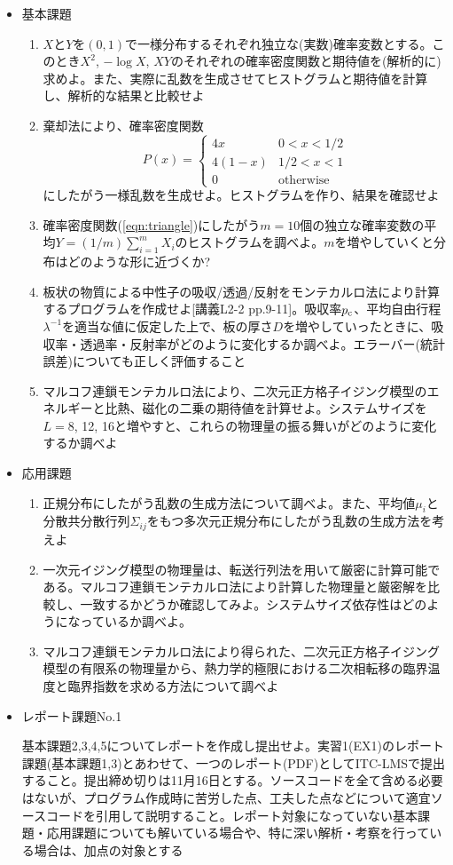 \documentclass[11pt]{jarticle}
\begin{document}
\begin{itemize}
\item 基本課題
  \begin{enumerate}
  \item $X$と$Y$を$(0,1)$で一様分布するそれぞれ独立な(実数)確率変数とする。このとき$X^2$, $-\log X$, $XY$のそれぞれの確率密度関数と期待値を(解析的に)求めよ。また、実際に乱数を生成させてヒストグラムと期待値を計算し、解析的な結果と比較せよ
  \item 棄却法により、確率密度関数
    \begin{equation}
      P(x) = \begin{cases} 4x & 0 < x < 1/2 \\
        4(1-x) & 1/2 < x < 1 \\
        0 & \text{otherwise}
      \end{cases}
      \label{eqn:triangle}
    \end{equation}
    にしたがう一様乱数を生成せよ。ヒストグラムを作り、結果を確認せよ
  \item 確率密度関数(\ref{eqn:triangle})にしたがう$m=10$個の独立な確率変数の平均$Y=(1/m) \sum_{i=1}^m X_i$のヒストグラムを調べよ。$m$を増やしていくと分布はどのような形に近づくか?
  \item 板状の物質による中性子の吸収/透過/反射をモンテカルロ法により計算するプログラムを作成せよ[講義L2-2 pp.9-11]。吸収率$p_{\rm c}$、平均自由行程$\lambda^{-1}$を適当な値に仮定した上で、板の厚さ$D$を増やしていったときに、吸収率・透過率・反射率がどのように変化するか調べよ。エラーバー(統計誤差)についても正しく評価すること
  \item マルコフ連鎖モンテカルロ法により、二次元正方格子イジング模型のエネルギーと比熱、磁化の二乗の期待値を計算せよ。システムサイズを$L=8$, 12, 16と増やすと、これらの物理量の振る舞いがどのように変化するか調べよ
  \end{enumerate}  
\item 応用課題
  \begin{enumerate}
  \item 正規分布にしたがう乱数の生成方法について調べよ。また、平均値$\mu_i$と分散共分散行列$\Sigma_{ij}$をもつ多次元正規分布にしたがう乱数の生成方法を考えよ
  \item 一次元イジング模型の物理量は、転送行列法を用いて厳密に計算可能である。マルコフ連鎖モンテカルロ法により計算した物理量と厳密解を比較し、一致するかどうか確認してみよ。システムサイズ依存性はどのようになっているか調べよ。
  \item マルコフ連鎖モンテカルロ法により得られた、二次元正方格子イジング模型の有限系の物理量から、熱力学的極限における二次相転移の臨界温度と臨界指数を求める方法について調べよ
  \end{enumerate}

\item レポート課題No.1

  基本課題2,3,4,5についてレポートを作成し提出せよ。実習1(EX1)のレポート課題(基本課題1,3)とあわせて、一つのレポート(PDF)としてITC-LMSで提出すること。提出締め切りは11月16日とする。ソースコードを全て含める必要はないが、プログラム作成時に苦労した点、工夫した点などについて適宜ソースコードを引用して説明すること。レポート対象になっていない基本課題・応用課題についても解いている場合や、特に深い解析・考察を行っている場合は、加点の対象とする
\end{itemize}
\end{document}
